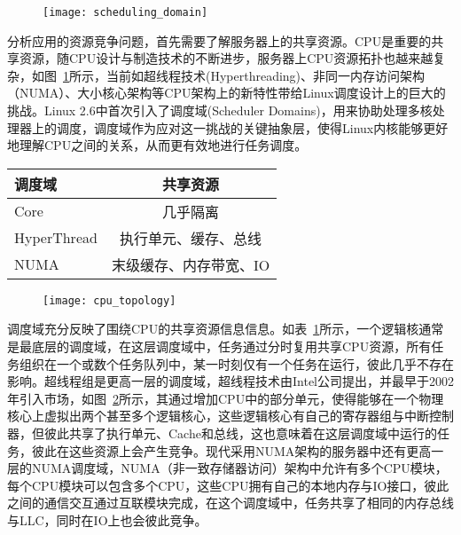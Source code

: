 \begin{figure}[!htbp]
    \centering
    \texttt{[image: scheduling\_domain]}
    \label{fig:scheduling_domain}
\end{figure}

分析应用的资源竞争问题，首先需要了解服务器上的共享资源。CPU是重要的共享资源，随CPU设计与制造技术的不断进步，服务器上CPU资源拓扑也越来越复杂，如图~\ref{fig:scheduling_domain}所示，当前如超线程技术(Hyperthreading)、非同一内存访问架构（NUMA）、大小核心架构等CPU架构上的新特性带给Linux调度设计上的巨大的挑战。Linux 2.6中首次引入了调度域(Scheduler Domains)\citep{schedulerdomains}，用来协助处理多核处理器上的调度，调度域作为应对这一挑战的关键抽象层，使得Linux内核能够更好地理解CPU之间的关系，从而更有效地进行任务调度。

\begin{table}[!htbp]
    \label{tab:resourcesharing}
    \footnotesize%
    \setlength{\tabcolsep}{4pt}%
    \renewcommand{\arraystretch}{1.5}%
    \centering
    \begin{tabular}{lc}
        \hline
        调度域 & 共享资源\\
        \hline
        Core & 几乎隔离\\
        HyperThread & 执行单元、缓存、总线\\
        NUMA & 末级缓存、内存带宽、IO\\
        \hline
    \end{tabular}
\end{table}

\begin{figure}[!htbp]
    \centering
    \texttt{[image: cpu\_topology]}
    \label{fig:cpu_topology}
\end{figure}

调度域充分反映了围绕CPU的共享资源信息信息。如表~\ref{tab:resourcesharing}所示，一个逻辑核通常是最底层的调度域，在这层调度域中，任务通过分时复用共享CPU资源，所有任务组织在一个或数个任务队列中，某一时刻仅有一个任务在运行，彼此几乎不存在影响。超线程组是更高一层的调度域，超线程技术由Intel公司提出，并最早于2002年引入市场，如图~\ref{fig:cpu_topology}所示，其通过增加CPU中的部分单元，使得能够在一个物理核心上虚拟出两个甚至多个逻辑核心，这些逻辑核心有自己的寄存器组与中断控制器，但彼此共享了执行单元、Cache和总线，这也意味着在这层调度域中运行的任务，彼此在这些资源上会产生竞争。现代采用NUMA架构的服务器中还有更高一层的NUMA调度域，NUMA（非一致存储器访问）架构中允许有多个CPU模块，每个CPU模块可以包含多个CPU，这些CPU拥有自己的本地内存与IO接口，彼此之间的通信交互通过互联模块完成，在这个调度域中，任务共享了相同的内存总线与LLC，同时在IO上也会彼此竞争。

